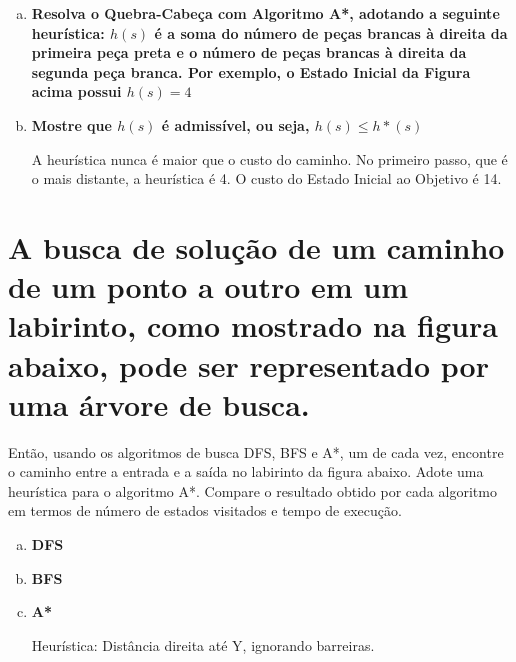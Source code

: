 \documentclass[paper=a4, fontsize=11pt]{scrartcl} %
\begin{document}
    \begin{enumerate}[(a)]
        \pagebreak
        \item \textbf{Resolva o Quebra-Cabeça com Algoritmo A*, adotando a seguinte heurística: $h(s)$ é a soma do número de peças brancas à direita da primeira peça preta e o número de peças brancas à direita da segunda peça branca. Por exemplo, o Estado Inicial da Figura acima possui $h(s) = 4$}
        \par 
        \vspace{0.2cm}

        \item \textbf{Mostre que $h(s)$ é admissível, ou seja, $h(s) \leq h*(s)$}
        \par A heurística nunca é maior que o custo do caminho. No primeiro passo, que é o mais distante, a heurística é 4. O custo do Estado Inicial ao Objetivo é 14.
        \vspace{0.2cm}

    \end{enumerate}

    
    \section{A busca de solução de um caminho de um ponto a outro em um labirinto, como mostrado na figura abaixo, pode ser representado por uma árvore de busca.}
    
    \par Então, usando os algoritmos de busca DFS, BFS e A*, um de cada vez, encontre o caminho entre a entrada e a saída no labirinto da figura abaixo. Adote uma heurística para o algoritmo A*. Compare o resultado obtido por cada algoritmo em termos de número de estados visitados e tempo de execução.

    \begin{enumerate}[(a)]
        \item \textbf{DFS}
        \par 
        \vspace{0.2cm}
        \pagebreak
        \item \textbf{BFS}
        \par 
        \vspace{0.2cm}
        \pagebreak
        \item \textbf{A*}
        \par Heurística: Distância direita até Y, ignorando barreiras.
        \par 
        \vspace{0.2cm}

    \end{enumerate}


    
\end{document}
